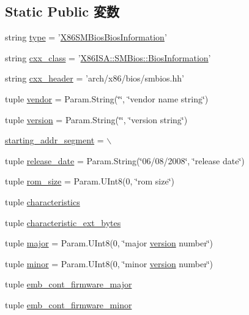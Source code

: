 \subsection*{Static Public 変数}
\begin{DoxyCompactItemize}
\item 
string \hyperlink{classSMBios_1_1X86SMBiosBiosInformation_acce15679d830831b0bbe8ebc2a60b2ca}{type} = '\hyperlink{classSMBios_1_1X86SMBiosBiosInformation}{X86SMBiosBiosInformation}'
\item 
string \hyperlink{classSMBios_1_1X86SMBiosBiosInformation_a58cd55cd4023648e138237cfc0822ae3}{cxx\_\-class} = '\hyperlink{classX86ISA_1_1SMBios_1_1BiosInformation}{X86ISA::SMBios::BiosInformation}'
\item 
string \hyperlink{classSMBios_1_1X86SMBiosBiosInformation_a17da7064bc5c518791f0c891eff05fda}{cxx\_\-header} = 'arch/x86/bios/smbios.hh'
\item 
tuple \hyperlink{classSMBios_1_1X86SMBiosBiosInformation_af18d8b19bc59dc637e09c47787f115a8}{vendor} = Param.String(\char`\"{}\char`\"{}, \char`\"{}vendor name string\char`\"{})
\item 
tuple \hyperlink{classSMBios_1_1X86SMBiosBiosInformation_a76aa01cd80eeb03b381ebe36f17c16b2}{version} = Param.String(\char`\"{}\char`\"{}, \char`\"{}version string\char`\"{})
\item 
\hyperlink{classSMBios_1_1X86SMBiosBiosInformation_abb971818cdd9c898cb5e830ed787abd6}{starting\_\-addr\_\-segment} = $\backslash$
\item 
tuple \hyperlink{classSMBios_1_1X86SMBiosBiosInformation_aa22e95cd89d426a4b5b3ca65a02cefe7}{release\_\-date} = Param.String(\char`\"{}06/08/2008\char`\"{}, \char`\"{}release date\char`\"{})
\item 
tuple \hyperlink{classSMBios_1_1X86SMBiosBiosInformation_ad518e8cb11710ccf7308544aceac1322}{rom\_\-size} = Param.UInt8(0, \char`\"{}rom size\char`\"{})
\item 
tuple \hyperlink{classSMBios_1_1X86SMBiosBiosInformation_a7eeca92fcd997db286edb761234ec830}{characteristics}
\item 
tuple \hyperlink{classSMBios_1_1X86SMBiosBiosInformation_a86fb1448dd5aa1cacec39707ee5ac79e}{characteristic\_\-ext\_\-bytes}
\item 
tuple \hyperlink{classSMBios_1_1X86SMBiosBiosInformation_a0901fe6d4aa32a2db74b66c2f6cb69cb}{major} = Param.UInt8(0, \char`\"{}major \hyperlink{classSMBios_1_1X86SMBiosBiosInformation_a76aa01cd80eeb03b381ebe36f17c16b2}{version} number\char`\"{})
\item 
tuple \hyperlink{classSMBios_1_1X86SMBiosBiosInformation_a61b9da14aed8fec0d72bc3b6d6044a0b}{minor} = Param.UInt8(0, \char`\"{}minor \hyperlink{classSMBios_1_1X86SMBiosBiosInformation_a76aa01cd80eeb03b381ebe36f17c16b2}{version} number\char`\"{})
\item 
tuple \hyperlink{classSMBios_1_1X86SMBiosBiosInformation_a358b1c1a9734c935d1756618e34b8efe}{emb\_\-cont\_\-firmware\_\-major}
\item 
tuple \hyperlink{classSMBios_1_1X86SMBiosBiosInformation_a9c6939a262f00e59c8b7f7b14523169d}{emb\_\-cont\_\-firmware\_\-minor}
\end{DoxyCompactItemize}


